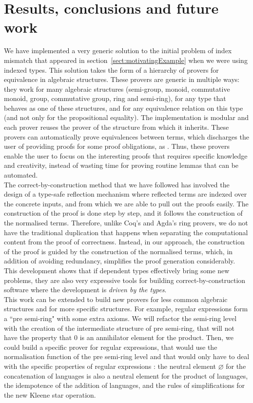 \section{Results, conclusions and future work}

We have implemented a very generic solution to the initial problem of index mismatch that appeared in section~\ref{sect:motivatingExample} when we were using indexed types. This solution takes the form of a hierarchy of provers for equivalence in algebraic structures. These provers are generic in multiple ways: they work for many algebraic structures (semi-group, monoid, commutative monoid, group, commutative group, ring and semi-ring), for any type that behaves as one of these structures, and for any equivalence relation on this type (and not only for the propositional equality). The implementation is modular and each prover reuses the prover of the structure from which it inherits. These provers can automatically prove equivalences between terms, which discharges the user of providing proofs for some proof obligations, as . Thus, these provers enable the user to focus on the interesting proofs that requires specific knowledge and creativity, instead of wasting time for proving routine lemmas that can be automated.\\

The correct-by-construction method that we have followed has involved the design of a type-safe reflection mechanism where reflected terms are indexed over the concrete inputs, and from which we are able to pull out the proofs easily. The construction of the proof is done step by step, and it follows the construction of the normalised terms. Therefore, unlike Coq's and Agda's ring provers, we do not have the traditional duplication that happens when separating the computational content from the proof of correctness. Instead, in our approach, the construction of the proof is guided by the construction of the normalised terms, which, in addition of avoiding redundancy, simplifies the proof generation considerably. This development shows that if dependent types effectively bring some new problems, they are also very expressive tools for building correct-by-construction software where the development is \emph{driven by the types}. \\

This work can be extended to build new provers for less common algebraic structures and for more specific structures. For example, regular expressions form a ``pre semi-ring" with some extra axioms. We will refactor the semi-ring level with the creation of the intermediate structure of pre semi-ring, that will not have the property that $0$ is an annihilator element for the product. Then, we could build a specific prover for regular expressions, that would use the normalisation function of the pre semi-ring level and that would only have to deal with the specific properties of regular expressions : the neutral element $\varnothing$ for the concatenation of languages is also a neutral element for the product of languages, the idempotence of the addition of languages, and the rules of simplifications for the new Kleene star operation.


